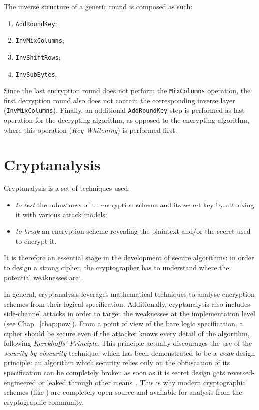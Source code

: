         The inverse structure of a generic round is composed as such:
        \begin{enumerate}
            \item \texttt{AddRoundKey};
            \item \texttt{InvMixColumns};
            \item \texttt{InvShiftRows};
            \item \texttt{InvSubBytes}.
        \end{enumerate}
        Since the last encryption round does not perform the \texttt{MixColumns} operation, the first decryption round also does not contain the corresponding inverse layer (\texttt{InvMixColumns}).
        Finally, an additional \texttt{AddRoundKey} step is performed as last operation for the decrypting algorithm, as opposed to the encrypting algorithm, where this operation (\emph{Key Whitening}) is performed first.
    
\section{Cryptanalysis}\label{sec:cryptanalysis}
    Cryptanalysis is a set of techniques used:
    \begin{itemize}
        \item \emph{to test} the robustness of an encryption scheme and its secret key by attacking it with various attack models;
        \item \emph{to break} an encryption scheme revealing the plaintext and/or the secret used to encrypt it.
    \end{itemize}

    It is therefore an essential stage in the development of secure algorithms: in order to design a strong cipher, the cryptographer has to understand where the potential weaknesses are~\cite{decanniere2006cryptanalysis}.
    
    In general, cryptanalysis leverages mathematical techniques to analyse encryption schemes from their logical specification. Additionally, cryptanalysis also includes side-channel attacks in order to target the weaknesses at the implementation level (see Chap.~\ref{chap:pow}).
    From a point of view of the bare logic specification, a cipher should be secure even if the attacker knows every detail of the algorithm, following \emph{Kerckhoffs’ Principle}. This principle actually discourages the use of the \emph{security by obscurity} technique, which has been demonstrated to be a \emph{weak} design principle: an algorithm which security relies only on the obfuscation of its specification can be completely broken as soon as it is secret design gets reversed-engineered or leaked through other means~\cite{paar2009understanding}. This is why modern cryptographic schemes (like \aes{}) are completely open source and available for analysis from the cryptographic community.

